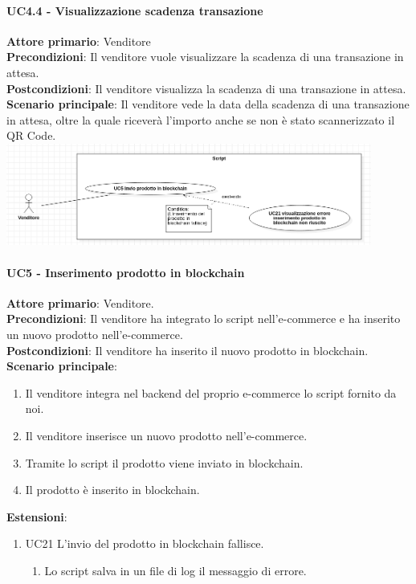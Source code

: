 \documentclass[a4paper, 12pt]{article}
\begin{document}
\paragraph{UC4.4 - Visualizzazione scadenza transazione}
\textbf{Attore primario}: Venditore\\
\textbf{Precondizioni}: Il venditore vuole visualizzare la scadenza di una transazione in attesa.\\
\textbf{Postcondizioni}: Il venditore visualizza la scadenza di una transazione in attesa.\\
\textbf{Scenario principale}: Il venditore vede la data della scadenza di una transazione in attesa, oltre la quale riceverà l'importo anche se non è stato scannerizzato il QR Code.\\

\includegraphics[width=0.9\textwidth]{UseCase_script1}

\paragraph{UC5 - Inserimento prodotto in blockchain}
\textbf{Attore primario}: Venditore.\\
\textbf{Precondizioni}: Il venditore ha integrato lo script nell'e-commerce e ha inserito un nuovo prodotto nell'e-commerce.\\
\textbf{Postcondizioni}: Il venditore ha inserito il nuovo prodotto in blockchain.\\
\textbf{Scenario principale}:
\begin{enumerate}
    \item Il venditore integra nel backend del proprio e-commerce lo script fornito da noi.
    \item Il venditore inserisce un nuovo prodotto nell'e-commerce.
    \item Tramite lo script il prodotto viene inviato in blockchain.
    \item Il prodotto è inserito in blockchain.
\end{enumerate}
\textbf{Estensioni}:
\begin{enumerate}
    \item UC21 L'invio del prodotto in blockchain fallisce.
    \begin{enumerate}
        \item Lo script salva in un file di log il messaggio di errore.
    \end{enumerate}
\end{enumerate}
\end{document}
